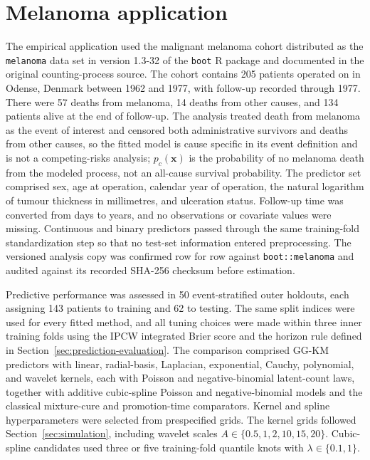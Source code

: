 \section{Melanoma application}\label{sec:melanoma}

The empirical application used the malignant melanoma cohort distributed
as the \texttt{melanoma} data set in version 1.3-32 of the \texttt{boot}
R package and documented in the original counting-process source.
\cite{boot2025,andersen1993} The cohort contains 205 patients operated
on in Odense, Denmark between 1962 and 1977, with follow-up recorded through
1977. There were 57 deaths from melanoma, 14 deaths from other causes,
and 134 patients alive at the end of follow-up. The analysis treated
death from melanoma as the event of interest and censored both administrative
survivors and deaths from other causes, so the fitted model is cause
specific in its event definition and is not a competing-risks analysis;
$p_c(\bm{x})$ is the probability of no melanoma death from the modeled
process, not an all-cause survival probability.
The predictor set comprised sex, age at operation, calendar year of
operation, the natural logarithm of tumour thickness in millimetres, and
ulceration status. Follow-up time was converted from days to years, and
no observations or covariate values were missing. Continuous and binary
predictors passed through the same training-fold standardization step so
that no test-set information entered preprocessing. The versioned
analysis copy was confirmed row for row against \texttt{boot::melanoma}
and audited against its recorded SHA-256 checksum before estimation.

Predictive performance was assessed in 50 event-stratified outer holdouts,
each assigning 143 patients to training and 62 to testing. The same split
indices were used for every fitted method, and all tuning choices were made
within three inner training folds using the IPCW integrated Brier score
and the horizon rule defined in Section~\ref{sec:prediction-evaluation}.
The comparison comprised GG-KM predictors with linear, radial-basis,
Laplacian, exponential, Cauchy, polynomial, and wavelet kernels, each
with Poisson and negative-binomial latent-count laws, together with
additive cubic-spline Poisson and negative-binomial models and the
classical mixture-cure and promotion-time comparators. Kernel and spline
hyperparameters were selected from prespecified grids. The kernel grids
followed Section~\ref{sec:simulation}, including wavelet scales
$A\in\{0.5,1,2,10,15,20\}$. Cubic-spline candidates used three or five
training-fold quantile knots with $\lambda\in\{0.1,1\}$.

